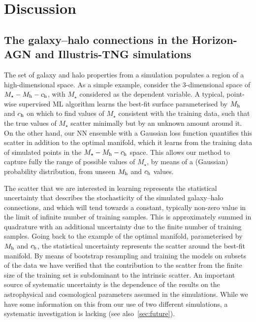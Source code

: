 \documentclass[useAMS,usenatbib]{mnras}
\begin{document}
\section{Discussion}
\label{sec:Discussion}

\subsection{The galaxy--halo connections in the Horizon-AGN and Illustris-TNG simulations}\label{sec:sim_comp}

The set of galaxy and halo properties from a simulation populates a region of a high-dimensional space. As a simple example, consider the 3-dimensional space of $M_\star - M_{\rm h} - c_{\rm h}$, with $M_\star$ considered as the dependent variable. A typical, point-wise supervised ML algorithm learns the best-fit surface parameterised by $M_{\rm h}$ and $c_{\rm h}$ on which to find values of $M_\star$ consistent with the training data, such that the true values of $M_\star$ scatter minimally but by an unknown amount around it. On the other hand, our NN ensemble with a Gaussian loss function quantifies this scatter in addition to the optimal manifold, which it learns from the training data of simulated points in the $M_\star - M_{\rm h} - c_{\rm h}$ space. This allows our method to capture fully the range of possible values of $M_\star$, by means of a (Gaussian) probability distribution, from unseen $M_{\rm h}$ and $c_{\rm h}$ values.

The scatter that we are interested in learning represents the statistical uncertainty that describes the stochasticity of the simulated galaxy--halo connections, and which will tend towards a constant, typically non-zero value in the limit of infinite number of training samples. This is approximately summed in quadrature with an additional uncertainty due to the finite number of training samples. Going back to the example of the optimal manifold, parameterised by $M_{\rm h}$ and $c_{\rm h}$, the statistical uncertainty represents the scatter around the best-fit manifold.
By means of bootstrap resampling and training the models on subsets of the data we have verified that the contribution to the scatter from the finite size of the training set is subdominant to the intrinsic scatter. An important source of systematic uncertainty is the dependence of the results on the astrophysical and cosmological parameters assumed in the simulations. While we have some information on this from our use of two different simulations, a systematic investigation is lacking (see also~\cref{sec:future}).
\end{document}

